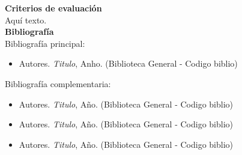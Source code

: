 \documentclass[letterpaper,10pt,onecolumn]{article}
\begin{document}
\noindent\textbf{\large {} \quad Criterios de evaluaci\'on}\\[-0.2cm]


\noindent\normalsize Aqu\'i texto.\\[0.1cm]

\noindent\textbf{\large {} \quad Bibliograf\'ia}\\[-0.2cm]


\noindent\normalsize Bibliograf\'ia principal:

\begin{itemize}
	\item Autores. \textit{Titulo}, Anho. (Biblioteca General - Codigo biblio)
\end{itemize}

\noindent\normalsize Bibliograf\'ia complementaria:

\begin{itemize}
	\item Autores. \textit{Titulo}, A\~no. (Biblioteca General - Codigo biblio)\\[-0.6cm]
	\item Autores. \textit{Titulo}, A\~no. (Biblioteca General - Codigo biblio)\\[-0.6cm]
	\item Autores. \textit{Titulo}, A\~no. (Biblioteca General - Codigo biblio)
\end{itemize}
\end{document}
